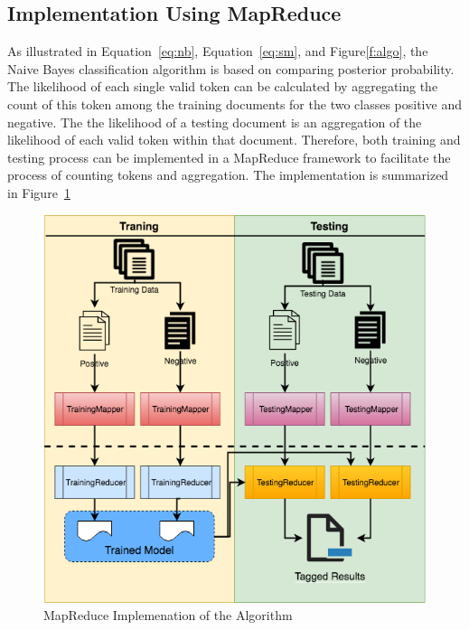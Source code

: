 \subsection{Implementation Using MapReduce}

As illustrated in Equation~\ref{eq:nb}, Equation~\ref{eq:sm}, and
Figure\ref{f:algo}, the Naive Bayes classification algorithm is based
on comparing posterior probability. The likelihood of each single
valid token can be calculated by aggregating the count of this token
among the training documents for the two classes positive and
negative. The the likelihood of a testing document is an aggregation
of the likelihood of each valid token within that document. Therefore,
both training and testing process can be implemented in a MapReduce
framework to facilitate the process of counting tokens and
aggregation. The implementation is summarized in Figure~\ref{f:mapreduce}

\begin{figure}[!ht]
	\centering\includegraphics[width=\columnwidth]{images/mapreduce.png}
	\caption{MapReduce Implemenation of the Algorithm}\label{f:mapreduce}
\end{figure}

